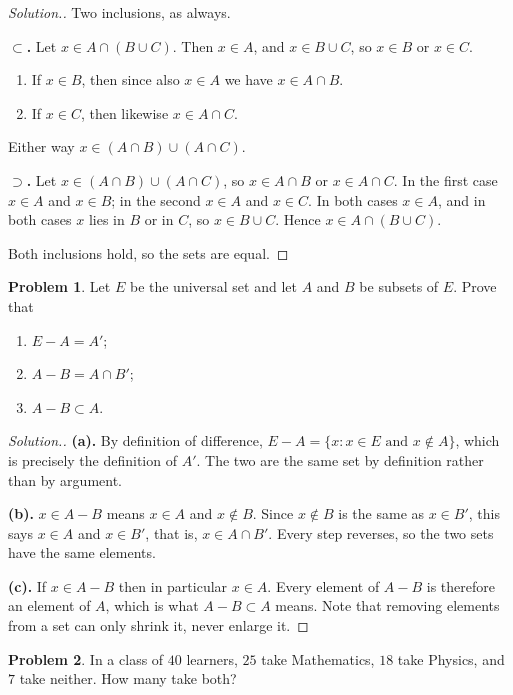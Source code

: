 \documentclass[11pt,a4paper]{article}
\theoremstyle{definition}
\newtheorem{problemx}{Problem}[section]
\newenvironment{problem}{\begin{problemx}}{\end{problemx}}
\newenvironment{solution}
  {\renewcommand{\qedsymbol}{}\begin{proof}[\textit{Solution}.]}
  {\end{proof}}
\begin{document}
\begin{solution}
Two inclusions, as always.

\textbf{$\subset$.} Let $x\in A\cap(B\cup C)$. Then $x\in A$, and $x\in B\cup C$,
so $x\in B$ or $x\in C$.
\begin{enumerate}
\item[] If $x\in B$, then since also $x\in A$ we have $x\in A\cap B$.
\item[] If $x\in C$, then likewise $x\in A\cap C$.
\end{enumerate}
Either way $x\in(A\cap B)\cup(A\cap C)$.

\textbf{$\supset$.} Let $x\in(A\cap B)\cup(A\cap C)$, so $x\in A\cap B$ or
$x\in A\cap C$. In the first case $x\in A$ and $x\in B$; in the second $x\in A$ and
$x\in C$. In both cases $x\in A$, and in both cases $x$ lies in $B$ or in $C$, so
$x\in B\cup C$. Hence $x\in A\cap(B\cup C)$.

Both inclusions hold, so the sets are equal.
\end{solution}

\begin{problem}
Let $E$ be the universal set and let $A$ and $B$ be subsets of $E$. Prove that
\begin{enumerate}
\item[(a).] $E-A=A'$;
\item[(b).] $A-B=A\cap B'$;
\item[(c).] $A-B\subset A$.
\end{enumerate}
\end{problem}

\begin{solution}
\textbf{(a).} By definition of difference, $E-A=\{x: x\in E \text{ and }
x\notin A\}$, which is precisely the definition of $A'$. The two are the same set
by definition rather than by argument.

\textbf{(b).} $x\in A-B$ means $x\in A$ and $x\notin B$. Since $x\notin B$ is the
same as $x\in B'$, this says $x\in A$ and $x\in B'$, that is, $x\in A\cap B'$.
Every step reverses, so the two sets have the same elements.

\textbf{(c).} If $x\in A-B$ then in particular $x\in A$. Every element of $A-B$ is
therefore an element of $A$, which is what $A-B\subset A$ means. Note that
removing elements from a set can only shrink it, never enlarge it.
\end{solution}

\begin{problem}
In a class of $40$ learners, $25$ take Mathematics, $18$ take Physics, and $7$
take neither. How many take both?
\end{problem}
\end{document}
